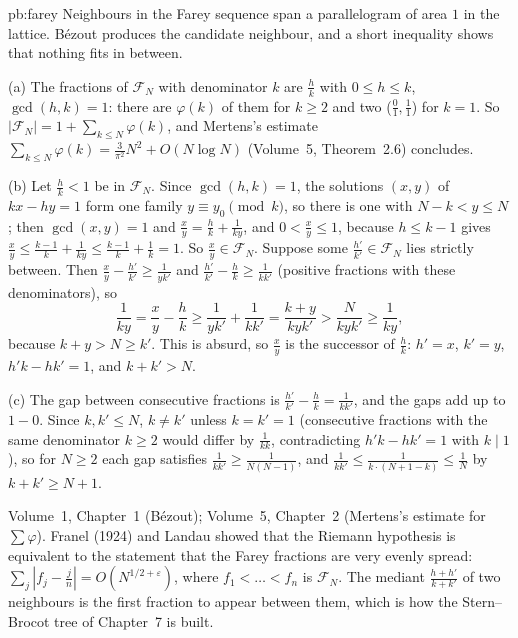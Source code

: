 \begin{solution}{pb:farey}
\idea Neighbours in the Farey sequence span a parallelogram of area $1$ in the lattice. Bézout produces the candidate neighbour,
and a short inequality shows that nothing fits in between.

\writeup (a) The fractions of $\mathcal F_N$ with denominator $k$ are $\frac hk$ with $0\le h\le k$, $\gcd(h,k)=1$: there are $\varphi(k)$ of
them for $k\ge2$ and two ($\frac01,\frac11$) for $k=1$. So $|\mathcal F_N|=1+\sum_{k\le N}\varphi(k)$, and Mertens's estimate
$\sum_{k\le N}\varphi(k)=\frac3{\pi^2}N^2+O(N\log N)$ (Volume~5, Theorem~2.6) concludes.

(b) Let $\frac hk<1$ be in $\mathcal F_N$. Since $\gcd(h,k)=1$, the solutions $(x,y)$ of $kx-hy=1$ form one family $y\equiv y_0\pmod k$,
so there is one with $N-k<y\le N$; then $\gcd(x,y)=1$ and $\frac xy=\frac hk+\frac1{ky}$, and $0<\frac xy\le1$, because $h\le k-1$ gives
$\frac xy\le\frac{k-1}k+\frac1{ky}\le\frac{k-1}k+\frac1k=1$. So $\frac xy\in\mathcal F_N$. Suppose some $\frac{h'}{k'}\in\mathcal F_N$ lies strictly
between. Then $\frac xy-\frac{h'}{k'}\ge\frac1{yk'}$ and $\frac{h'}{k'}-\frac hk\ge\frac1{kk'}$ (positive fractions with these
denominators), so
\[
\frac1{ky}=\frac xy-\frac hk\ge\frac1{yk'}+\frac1{kk'}=\frac{k+y}{kyk'}>\frac N{kyk'}\ge\frac1{ky},
\]
because $k+y>N\ge k'$. This is absurd, so $\frac xy$ is the successor of $\frac hk$: $h'=x$, $k'=y$, $h'k-hk'=1$, and $k+k'>N$.

(c) The gap between consecutive fractions is $\frac{h'}{k'}-\frac hk=\frac1{kk'}$, and the gaps add up to $1-0$. Since $k,k'\le N$, $k\ne k'$
unless $k=k'=1$ (consecutive fractions with the same denominator $k\ge2$ would differ by $\frac1{kk}$, contradicting $h'k-hk'=1$ with
$k\mid1$), so for $N\ge2$ each gap satisfies $\frac1{kk'}\ge\frac1{N(N-1)}$, and $\frac1{kk'}\le\frac1{k\cdot(N+1-k)}\le\frac1N$ by
$k+k'\ge N+1$.

\tools Volume~1, Chapter~1 (Bézout); Volume~5, Chapter~2 (Mertens's estimate for $\sum\varphi$).
\leads Franel (1924) and Landau showed that the Riemann hypothesis is equivalent to the statement that the Farey fractions are
very evenly spread: $\sum_j|f_j-\frac jn|=O(N^{1/2+\varepsilon})$, where $f_1<\dots<f_n$ is $\mathcal F_N$. The mediant
$\frac{h+h'}{k+k'}$ of two neighbours is the first fraction to appear between them, which is how the Stern--Brocot tree of
Chapter~7 is built.
\end{solution}

